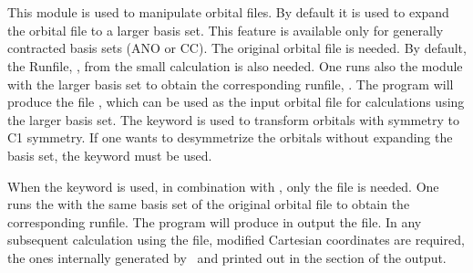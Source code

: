 \section{}
\label{UG:sec:expbas}

This module is used to manipulate orbital files. By default it is
used to expand the orbital file to a larger basis set.
This feature is available only for generally contracted basis sets (ANO or CC).
The original orbital file  is needed.
By default, the Runfile, ,
from the small calculation is also needed. One runs also the
 module with
the larger basis set to obtain the corresponding runfile, . The
program will produce the file , which can be used as the input
orbital file for calculations using the larger basis set.
The  keyword is used to transform orbitals with symmetry to
C1 symmetry.
If one wants to desymmetrize the orbitals without expanding the basis set, the keyword
 must be used.

When the 
keyword is used, in combination with , only the 
file is needed. One runs the 
with the same basis set of the original orbital file to obtain the corresponding
runfile. The program will produce in output the  file.
In any subsequent calculation using the  file, modified Cartesian
coordinates are required, the ones internally generated by \molcas\ and printed 
out in the  section of the output.

